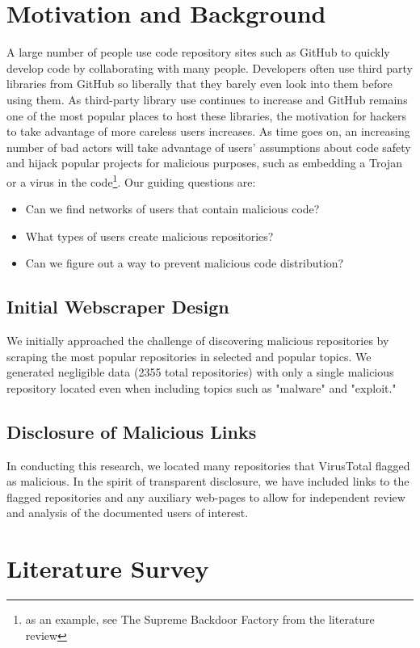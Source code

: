 \documentclass[]{acmart}
\begin{document}
\section{Motivation and Background}
A large number of people use code repository sites such as GitHub to quickly develop code by collaborating with many people. Developers often use third party libraries from GitHub so liberally that they barely even look into them before using them. As third-party library use continues to increase and GitHub remains one of the most popular places to host these libraries, the motivation for hackers to take advantage of more careless users increases. As time goes on, an increasing number of bad actors will take advantage of users' assumptions about code safety and hijack popular projects for malicious purposes, such as embedding a Trojan or a virus in the code\footnote{as an example, see The Supreme Backdoor Factory from the literature review}. Our guiding questions are:
\begin{itemize}
    \item Can we find networks of users that contain malicious code?
    \item What types of users create malicious repositories?
    \item Can we figure out a way to prevent malicious code distribution?
\end{itemize}
\subsection{Initial Webscraper Design}
We initially approached the challenge of discovering malicious repositories by scraping the most popular repositories in selected and popular topics. We generated negligible data (2355 total repositories) with only a single malicious repository located even when including topics such as "malware" and "exploit."
\subsection{Disclosure of Malicious Links}
In conducting this research, we located many repositories that VirusTotal flagged as malicious. In the spirit of transparent disclosure, we have included links to the flagged repositories and any auxiliary web-pages to allow for independent review and analysis of the documented users of interest. 
\section{Literature Survey}
\end{document}
